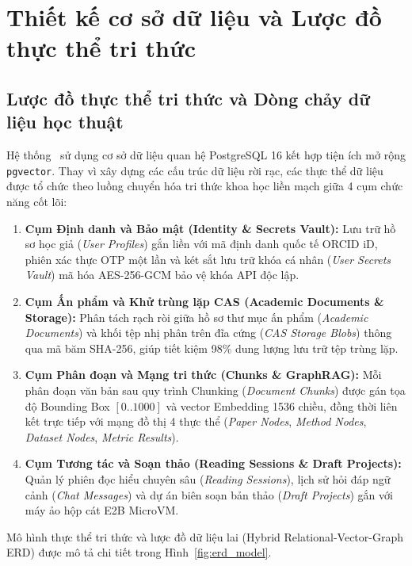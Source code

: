 \section{Thiết kế cơ sở dữ liệu và Lược đồ thực thể tri thức}
\label{sec:thiet_ke_db}

\subsection{Lược đồ thực thể tri thức và Dòng chảy dữ liệu học thuật}
\label{subsec:erd}
Hệ thống \VS\ sử dụng cơ sở dữ liệu quan hệ PostgreSQL 16 kết hợp tiện ích mở rộng \texttt{pgvector}. Thay vì xây dựng các cấu trúc dữ liệu rời rạc, các thực thể dữ liệu được tổ chức theo luồng chuyển hóa tri thức khoa học liền mạch giữa 4 cụm chức năng cốt lõi:

\begin{enumerate}[label=\textbf{(\arabic*)}, itemsep=2pt, topsep=2pt, parsep=0pt]
    \item \textbf{Cụm Định danh và Bảo mật (Identity \& Secrets Vault):} Lưu trữ hồ sơ học giả (\textit{User Profiles}) gắn liền với mã định danh quốc tế ORCID iD, phiên xác thực OTP một lần và két sắt lưu trữ khóa cá nhân (\textit{User Secrets Vault}) mã hóa AES-256-GCM bảo vệ khóa API độc lập.
    \item \textbf{Cụm Ấn phẩm và Khử trùng lặp CAS (Academic Documents \& Storage):} Phân tách rạch ròi giữa hồ sơ thư mục ấn phẩm (\textit{Academic Documents}) và khối tệp nhị phân trên đĩa cứng (\textit{CAS Storage Blobs}) thông qua mã băm SHA-256, giúp tiết kiệm 98\% dung lượng lưu trữ tệp trùng lặp.
    \item \textbf{Cụm Phân đoạn và Mạng tri thức (Chunks \& GraphRAG):} Mỗi phân đoạn văn bản sau quy trình Chunking (\textit{Document Chunks}) được gán tọa độ Bounding Box $[0..1000]$ và vector Embedding 1536 chiều, đồng thời liên kết trực tiếp với mạng đồ thị 4 thực thể (\textit{Paper Nodes}, \textit{Method Nodes}, \textit{Dataset Nodes}, \textit{Metric Results}).
    \item \textbf{Cụm Tương tác và Soạn thảo (Reading Sessions \& Draft Projects):} Quản lý phiên đọc hiểu chuyên sâu (\textit{Reading Sessions}), lịch sử hỏi đáp ngữ cảnh (\textit{Chat Messages}) và dự án biên soạn bản thảo (\textit{Draft Projects}) gắn với máy ảo hộp cát E2B MicroVM.
\end{enumerate}

Mô hình thực thể tri thức và lược đồ dữ liệu lai (Hybrid Relational-Vector-Graph ERD) được mô tả chi tiết trong Hình~\ref{fig:erd_model}.

